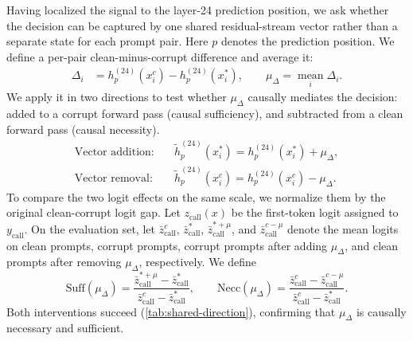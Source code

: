 \documentclass{article}
\begin{document}
Having localized the signal to the layer-24 prediction position, we ask
whether the decision can be captured by one shared residual-stream vector
rather than a separate state for each prompt pair. Here $p$ denotes the
prediction position. We define a per-pair
clean-minus-corrupt difference and average it:
\begin{align}
  \Delta_i
  &=
  h^{(24)}_p(x_i^c)
  -
  h^{(24)}_p(x_i^*),
  \qquad
  \mu_\Delta = \operatorname*{mean}_i \Delta_i .
  \label{eq:vector-def}
\end{align}
We apply it in two directions to test whether $\mu_\Delta$ causally mediates the decision: added to a corrupt forward pass (causal
sufficiency), and subtracted from a clean forward pass (causal necessity).
\begin{align}
  \text{Vector addition:} \quad
  &\tilde{h}^{(24)}_p(x_i^*)
  =
  h^{(24)}_p(x_i^*) + \mu_\Delta,
  \label{eq:vector-add}\\
  \text{Vector removal:} \quad
  &\tilde{h}^{(24)}_p(x_i^c)
  =
  h^{(24)}_p(x_i^c) - \mu_\Delta.
  \label{eq:vector-remove}
\end{align}
To compare the two logit effects on the same scale, we normalize them by
the original clean-corrupt logit gap. Let $z_{\mathrm{call}}(x)$ be the
first-token logit assigned to $y_{\mathrm{call}}$. On the evaluation set,
let $\bar{z}_{\mathrm{call}}^c$, $\bar{z}_{\mathrm{call}}^*$,
$\bar{z}_{\mathrm{call}}^{*+\mu}$, and
$\bar{z}_{\mathrm{call}}^{c-\mu}$ denote the mean logits on clean prompts, corrupt
prompts, corrupt prompts after adding $\mu_\Delta$, and clean prompts
after removing $\mu_\Delta$, respectively. We define
\begin{equation}
  \mathrm{Suff}(\mu_\Delta)
  =
  \frac{\bar{z}_{\mathrm{call}}^{*+\mu}-\bar{z}_{\mathrm{call}}^*}
  {\bar{z}_{\mathrm{call}}^c-\bar{z}_{\mathrm{call}}^*},
  \qquad
  \mathrm{Necc}(\mu_\Delta)
  =
  \frac{\bar{z}_{\mathrm{call}}^c-\bar{z}_{\mathrm{call}}^{c-\mu}}
  {\bar{z}_{\mathrm{call}}^c-\bar{z}_{\mathrm{call}}^*}.
  \label{eq:suff-necc}
\end{equation}
Both interventions succeed (\autoref{tab:shared-direction}), confirming that $\mu_\Delta$ is causally necessary and sufficient.
\end{document}
